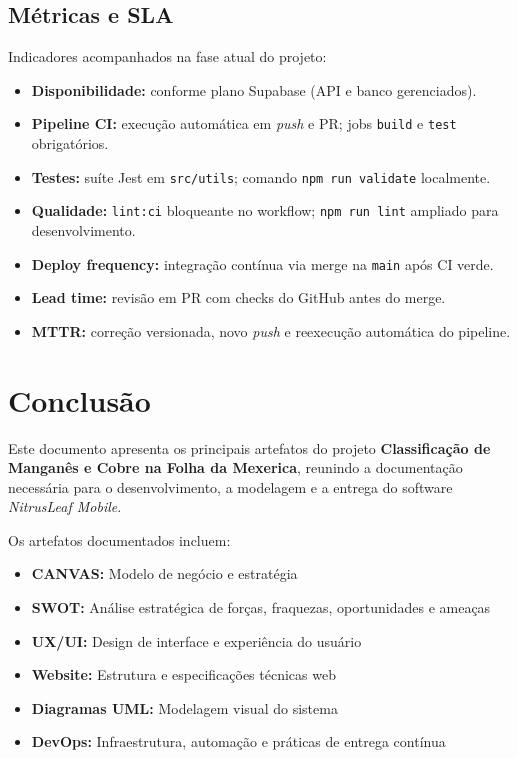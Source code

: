 \documentclass[11pt,a4paper]{article}
\begin{document}
\subsection{Métricas e SLA}

Indicadores acompanhados na fase atual do projeto:

\begin{itemize}
    \item \textbf{Disponibilidade:} conforme plano Supabase (API e banco gerenciados).
    \item \textbf{Pipeline CI:} execução automática em \textit{push} e PR; jobs \texttt{build} e \texttt{test} obrigatórios.
    \item \textbf{Testes:} suíte Jest em \texttt{src/utils}; comando \texttt{npm run validate} localmente.
    \item \textbf{Qualidade:} \texttt{lint:ci} bloqueante no workflow; \texttt{npm run lint} ampliado para desenvolvimento.
    \item \textbf{Deploy frequency:} integração contínua via merge na \texttt{main} após CI verde.
    \item \textbf{Lead time:} revisão em PR com checks do GitHub antes do merge.
    \item \textbf{MTTR:} correção versionada, novo \textit{push} e reexecução automática do pipeline.
\end{itemize}

\newpage
\section*{Conclusão}
{}

Este documento apresenta os principais artefatos do projeto \textbf{Classificação de Manganês e Cobre na Folha da Mexerica}, reunindo a documentação necessária para o desenvolvimento, a modelagem e a entrega do software \textit{NitrusLeaf Mobile}.

Os artefatos documentados incluem:
\begin{itemize}
    \item \textbf{CANVAS:} Modelo de negócio e estratégia
    \item \textbf{SWOT:} Análise estratégica de forças, fraquezas, oportunidades e ameaças
    \item \textbf{UX/UI:} Design de interface e experiência do usuário
    \item \textbf{Website:} Estrutura e especificações técnicas web
    \item \textbf{Diagramas UML:} Modelagem visual do sistema
    \item \textbf{DevOps:} Infraestrutura, automação e práticas de entrega contínua
\end{itemize}
\end{document}
